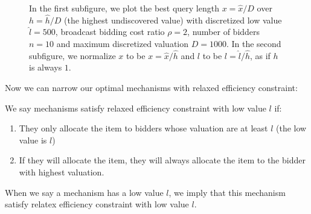 \begin{figure}
\centering
  \caption{In the first subfigure, we plot the best query length $x = \hat x / D$ over $h = \hat h / D$ (the highest
      undiscovered value) with discretized low value $\hat l = 500$,
      broadcast bidding cost ratio $\rho = 2$,
      number of bidders $n = 10$ and maximum discretized valuation
      $D = 1000$. In the second subfigure, we normalize $x$ to be $x = \hat x / \hat h$ and
      $l$ to be $l = \hat l / \hat h$, as if $h$ is always $1$.}
\end{figure}

Now we can narrow our optimal mechanisms with relaxed efficiency constraint:

\begin{definition}

We say mechanisms satisfy relaxed efficiency constraint with low value $l$
if:

    \begin{enumerate}

    \item They only allocate the item to bidders whose valuation are at least
    $l$ (the low value is $l$)

    \item If they will allocate the item, they will always allocate the item to
    the bidder with highest valuation.

    \end{enumerate}

When we say a mechanism has a low value $l$, we imply that this mechanism
satisfy relatex efficiency constraint with low value $l$.

\end{definition}

